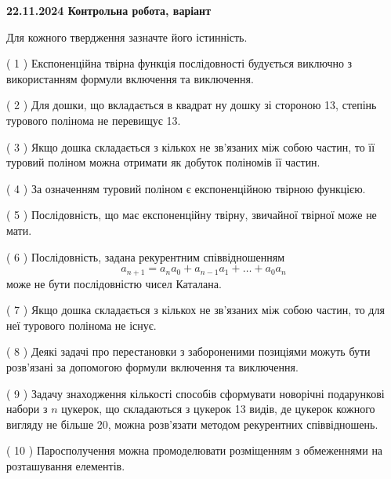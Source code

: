 \documentclass[12pt, ukrainian]{article}
\begin{document}
\vspace{4mm}
\newpage
\begin {large}

\textbf{22.11.2024 Контрольна робота, варіант  }\par


{
Для кожного твердження зазначте його істинність.\par
\vspace{2mm}
( 1 ) Експоненційна твірна функція послідовності будується виключно з використанням формули включення та виключення.%

( 2 ) Для дошки, що вкладається в квадрат ну дошку зі стороною 13, степінь турового полінома не перевищує 13.%

( 3 ) Якщо дошка складається з кількох не зв’язаних між собою частин, то її туровий поліном можна отримати як добуток поліномів її частин.%

( 4 ) За означенням туровий поліном є експоненційною твірною функцією.%

( 5 ) Послідовність, що має експоненційну твірну, звичайної твірної може не мати.%

( 6 ) Послідовність, задана рекурентним співвідношенням $$a_{n+1}=a_{n}a_{0}+a_{n-1}a_{1}+\ldots+a_0a_{n}$$ може не бути послідовністю чисел Каталана.%

( 7 ) Якщо дошка складається з кількох не зв’язаних між собою частин, то для неї турового полінома не існує.%

( 8 ) Деякі задачі про перестановки з забороненими позиціями можуть бути розв’я\-за\-ні за допомогою формули включення та виключення.%

( 9 ) Задачу знаходження кількості способів сформувати новорічні подарункові набори з $n$ цукерок, що складаються з цукерок 13 видів, де цукерок кожного вигляду не більше 20, можна розв’язати методом рекурентних співвідношень.%

( 10 ) Паросполучення можна промоделювати розміщенням з обмеженнями на розташування елементів.%


\vspace{5mm}
}
\end {large}
\end{document}

